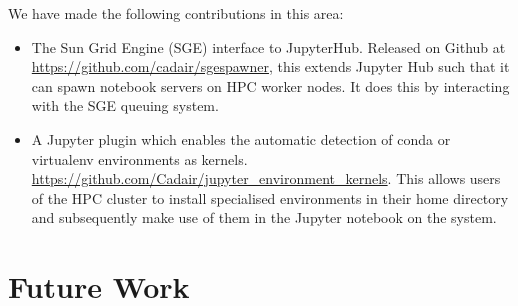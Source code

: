 \documentclass{deliverablereport}
\begin{document}
We have made the following contributions in this area:

\begin{itemize}
\item The Sun Grid Engine (SGE) interface to JupyterHub. Released on Github at \url{https://github.com/cadair/sgespawner}, this extends Jupyter Hub such that it can spawn notebook servers on HPC worker nodes. It does this by interacting with the SGE queuing system.
\item A Jupyter plugin which enables the automatic detection of conda or virtualenv environments as kernels. \url{https://github.com/Cadair/jupyter_environment_kernels}. This allows users of the HPC cluster to install specialised environments in their home directory and subsequently make use of them in the Jupyter notebook on the system.
\end{itemize}

\section{Future Work}
\end{document}
